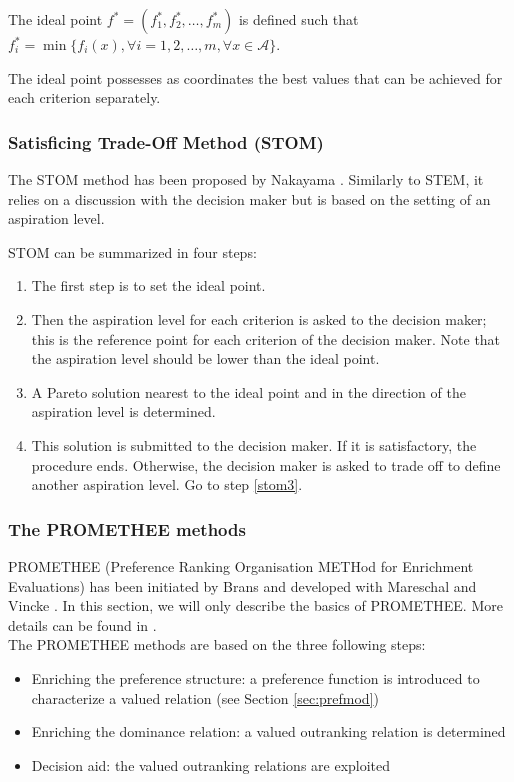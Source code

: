 \begin{definition}
\label{def:idealpoint}
The ideal point $f^*=(f_1^*, f_2^*, \dots, f_m^*)$ is defined such that $f_i^* = \min \{f_i(x), \forall i=1, 2, \dots, m, \forall x \in \mathcal{A}\}$.
\end{definition}
The ideal point possesses as coordinates the best values that can be achieved for each criterion separately.

\subsubsection{Satisficing Trade-Off Method (STOM)}
The STOM method has been proposed by Nakayama \cite{nakayama84}. Similarly to STEM, it relies on a discussion with the decision maker but is based on the setting of an aspiration level.

STOM can be summarized in four steps:
\begin{enumerate}
\item The first step is to set the ideal point.
\item Then the aspiration level for each criterion is asked to the decision maker; this is the reference point for each criterion of the decision maker. Note that the aspiration level should be lower than the ideal point.
\item \label{stom3} A Pareto solution nearest to the ideal point and in the direction of the aspiration level is determined.
\item This solution is submitted to the decision maker. If it is satisfactory, the procedure ends. Otherwise, the decision maker is asked to trade off to define another aspiration level. Go to step \ref{stom3}.
\end{enumerate}

\subsubsection{The PROMETHEE methods}
\label{sec:promethee}
PROMETHEE (Preference Ranking Organisation METHod for Enrichment Evaluations) has been initiated by Brans \cite{Brans1} and developed with Mareschal \cite{mares2ejor88} and Vincke \cite{BransMarechalVincke84}. In this section, we will only describe the basics of PROMETHEE. More details can be found in \cite{Beh2010}.\\
The PROMETHEE methods are based on the three following steps:
\begin{itemize}
\item Enriching the preference structure: a preference function is introduced to characterize a valued relation (see Section \ref{sec:prefmod})
\item Enriching the dominance relation: a valued outranking relation is determined
\item Decision aid: the valued outranking relations are exploited
\end{itemize}

